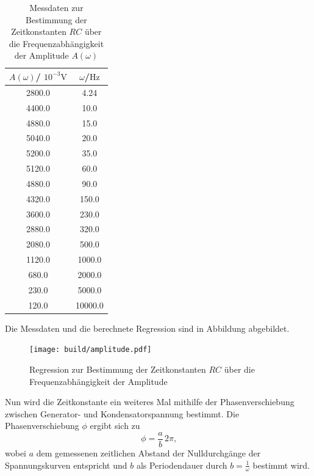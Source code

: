 \begin{table}
	\caption{Messdaten zur Bestimmung der Zeitkonstanten $RC$ über die Frequenzabhängigkeit der Amplitude $A(\omega)$}
	\label{tab:tab2}
	\centering
	\begin{tabular}{cc}
		\toprule
		$A(\omega)$/ $10^{-3} \si{\volt}$ & $\omega$/$\si{\Hz}$ \\
		\midrule
		2800.0                            & 4.24                \\
		4400.0                            & 10.0                \\
		4880.0                            & 15.0                \\
		5040.0                            & 20.0                \\
		5200.0                            & 35.0                \\
		5120.0                            & 60.0                \\
		4880.0                            & 90.0                \\
		4320.0                            & 150.0               \\
		3600.0                            & 230.0               \\
		2880.0                            & 320.0               \\
		2080.0                            & 500.0               \\
		1120.0                            & 1000.0              \\
		680.0                             & 2000.0              \\
		230.0                             & 5000.0              \\
		120.0                             & 10000.0             \\
		\bottomrule
	\end{tabular}
\end{table}

Die Messdaten und die berechnete Regression sind in Abbildung  abgebildet.
\begin{figure}
	\centering
	\texttt{[image: build/amplitude.pdf]}
	\caption{Regression zur Bestimmung der Zeitkonstanten $RC$ über die Frequenzabhängigkeit der Amplitude}
	\label{fig:plotb}
\end{figure}



Nun wird die Zeitkonstante ein weiteres Mal mithilfe der Phasenverschiebung zwischen Generator- und Kondensatorspannung bestimmt.
Die Phasenverschiebung $\phi$ ergibt sich zu
\begin{equation*}
	\phi = \frac{a}{b} \, 2\pi \text{,}
\end{equation*}
wobei $a$ dem gemessenen zeitlichen Abstand der Nulldurchgänge der Spannungskurven entspricht und $b$ als Periodendauer durch $b = \frac{1}{\omega}$ bestimmt wird.

